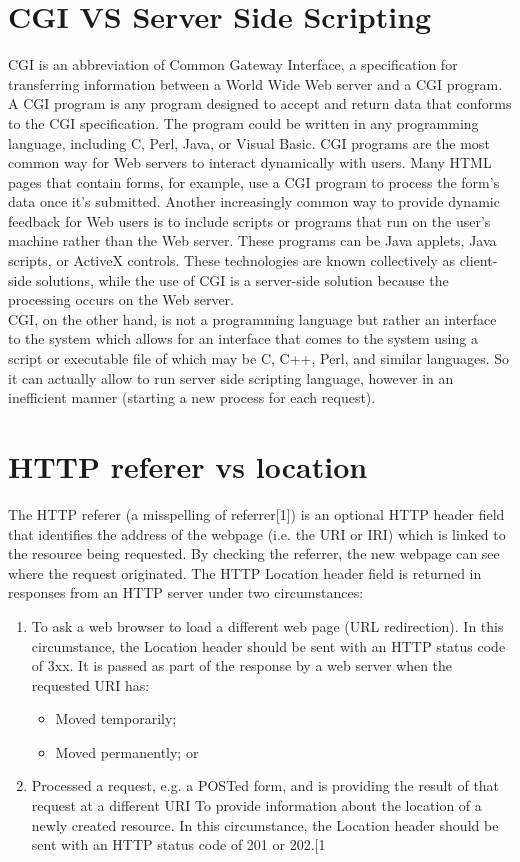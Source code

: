 \documentclass[11pt]{article}
\author{eo shiru}
\date{\today}
\title{}
\begin{document}
\tableofcontents


\section{CGI VS Server Side Scripting}
\label{sec:orge82c019}
CGI is an abbreviation of Common Gateway Interface, a specification for transferring information between a World Wide Web server and a CGI program. A CGI program is any program designed to accept and return data that conforms to the CGI specification. The program could be written in any programming language, including C, Perl, Java, or Visual Basic. CGI programs are the most common way for Web servers to interact dynamically with users. Many HTML pages that contain forms, for example, use a CGI program to process the form's data once it's submitted. Another increasingly common way to provide dynamic feedback for Web users is to include scripts or programs that run on the user's machine rather than the Web server. These programs can be Java applets, Java scripts, or ActiveX controls. These technologies are known collectively as client-side solutions, while the use of CGI is a server-side solution because the processing occurs on the Web server.\\
CGI, on the other hand, is not a programming language but rather an interface to the system which allows for an interface that comes to the system using a script or executable file of which may be C, C++, Perl, and similar languages. So it can actually allow to run server side scripting language, however in an inefficient manner (starting a new process for each request).

\section{HTTP referer vs location}
\label{sec:org8f160e7}
The HTTP referer (a misspelling of referrer[1]) is an optional HTTP header field that identifies the address of the webpage (i.e. the URI or IRI) which is linked to the resource being requested. By checking the referrer, the new webpage can see where the request originated.
The HTTP Location header field is returned in responses from an HTTP server under two circumstances:
\begin{enumerate}
\item To ask a web browser to load a different web page (URL redirection). In this circumstance, the Location header should be sent with an HTTP status code of 3xx. It is passed as part of the response by a web server when the requested URI has:
\begin{itemize}
\item Moved temporarily;
\item Moved permanently; or
\end{itemize}
\item Processed a request, e.g. a POSTed form, and is providing the result of that request at a different URI To provide information about the location of a newly created resource. In this circumstance, the Location header should be sent with an HTTP status code of 201 or 202.[1
\end{enumerate}
\end{document}

